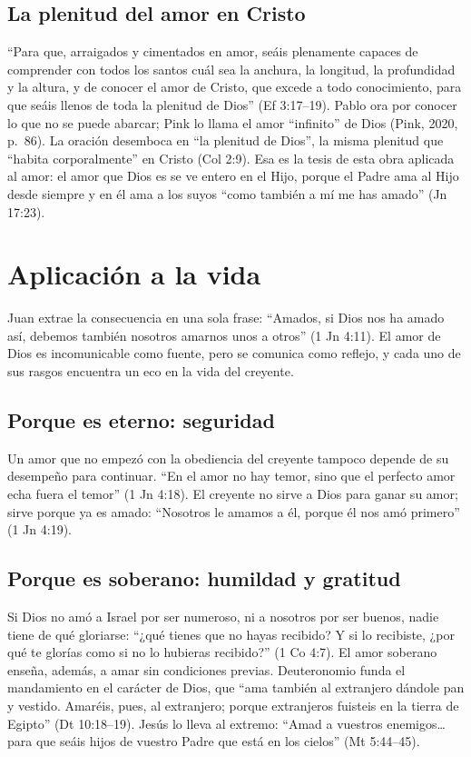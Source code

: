 \documentclass[11pt,letterpaper]{article}
\begin{document}
\subsection{La plenitud del amor en Cristo}
``Para que, arraigados y cimentados en amor, seáis plenamente capaces de comprender con todos los santos cuál sea la anchura, la longitud, la profundidad y la altura, y de conocer el amor de Cristo, que excede a todo conocimiento, para que seáis llenos de toda la plenitud de Dios'' (Ef 3:17--19). Pablo ora por conocer lo que no se puede abarcar; Pink lo llama el amor ``infinito'' de Dios (Pink, 2020, p.~86). La oración desemboca en ``la plenitud de Dios'', la misma plenitud que ``habita corporalmente'' en Cristo (Col 2:9). Esa es la tesis de esta obra aplicada al amor: el amor que Dios es se ve entero en el Hijo, porque el Padre ama al Hijo desde siempre y en él ama a los suyos ``como también a mí me has amado'' (Jn 17:23).

\section{Aplicación a la vida}

Juan extrae la consecuencia en una sola frase: ``Amados, si Dios nos ha amado así, debemos también nosotros amarnos unos a otros'' (1 Jn 4:11). El amor de Dios es incomunicable como fuente, pero se comunica como reflejo, y cada uno de sus rasgos encuentra un eco en la vida del creyente.

\subsection{Porque es eterno: seguridad}
Un amor que no empezó con la obediencia del creyente tampoco depende de su desempeño para continuar. ``En el amor no hay temor, sino que el perfecto amor echa fuera el temor'' (1 Jn 4:18). El creyente no sirve a Dios para ganar su amor; sirve porque ya es amado: ``Nosotros le amamos a él, porque él nos amó primero'' (1 Jn 4:19).

\subsection{Porque es soberano: humildad y gratitud}
Si Dios no amó a Israel por ser numeroso, ni a nosotros por ser buenos, nadie tiene de qué gloriarse: ``¿qué tienes que no hayas recibido? Y si lo recibiste, ¿por qué te glorías como si no lo hubieras recibido?'' (1 Co 4:7). El amor soberano enseña, además, a amar sin condiciones previas. Deuteronomio funda el mandamiento en el carácter de Dios, que ``ama también al extranjero dándole pan y vestido. Amaréis, pues, al extranjero; porque extranjeros fuisteis en la tierra de Egipto'' (Dt 10:18--19). Jesús lo lleva al extremo: ``Amad a vuestros enemigos\ldots{} para que seáis hijos de vuestro Padre que está en los cielos'' (Mt 5:44--45).
\end{document}
